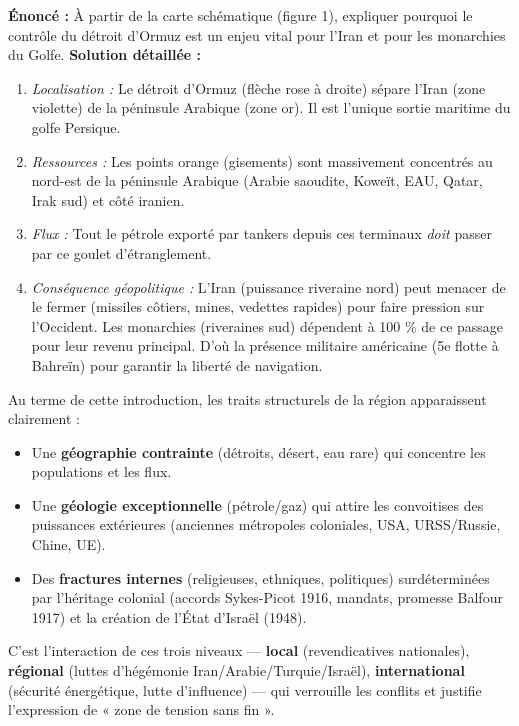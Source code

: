 \documentclass[11pt]{article}
\newcounter{popsec}
\newcounter{popsub}
\newcommand{\courssub}[1]{%
  \stepcounter{popsub}%
  \par\vspace{9pt}\noindent{\popxbold\fontsize{11.5}{13}\selectfont\color{popink}{\color{poporange}\thepopsec.\thepopsub}\hspace{6pt}#1}\par\nopagebreak\vspace{4pt}
}
\begin{document}
\begin{exoresolu}
\textbf{Énoncé :} À partir de la carte schématique (figure 1), expliquer pourquoi le contrôle du détroit d'Ormuz est un enjeu vital pour l'Iran et pour les monarchies du Golfe.
\textbf{Solution détaillée :}
\begin{enumerate}
    \item \emph{Localisation :} Le détroit d'Ormuz (flèche rose à droite) sépare l'Iran (zone violette) de la péninsule Arabique (zone or). Il est l'unique sortie maritime du golfe Persique.
    \item \emph{Ressources :} Les points orange (gisements) sont massivement concentrés au nord-est de la péninsule Arabique (Arabie saoudite, Koweït, EAU, Qatar, Irak sud) et côté iranien. 
    \item \emph{Flux :} Tout le pétrole exporté par tankers depuis ces terminaux \emph{doit} passer par ce goulet d'étranglement.
    \item \emph{Conséquence géopolitique :} L'Iran (puissance riveraine nord) peut menacer de le fermer (missiles côtiers, mines, vedettes rapides) pour faire pression sur l'Occident. Les monarchies (riveraines sud) dépendent à 100 \% de ce passage pour leur revenu principal. D'où la présence militaire américaine (5e flotte à Bahreïn) pour garantir la liberté de navigation.
\end{enumerate}
\end{exoresolu}

\courssub{Problématique et annonce du plan}

Au terme de cette introduction, les traits structurels de la région apparaissent clairement :
\begin{itemize}
    \item Une \textbf{géographie contrainte} (détroits, désert, eau rare) qui concentre les populations et les flux.
    \item Une \textbf{géologie exceptionnelle} (pétrole/gaz) qui attire les convoitises des puissances extérieures (anciennes métropoles coloniales, USA, URSS/Russie, Chine, UE).
    \item Des \textbf{fractures internes} (religieuses, ethniques, politiques) surdéterminées par l'héritage colonial (accords Sykes-Picot 1916, mandats, promesse Balfour 1917) et la création de l'État d'Israël (1948).
\end{itemize}

C'est l'interaction de ces trois niveaux — \textbf{local} (revendicatives nationales), \textbf{régional} (luttes d'hégémonie Iran/Arabie/Turquie/Israël), \textbf{international} (sécurité énergétique, lutte d'influence) — qui verrouille les conflits et justifie l'expression de « zone de tension sans fin ».
\end{document}
